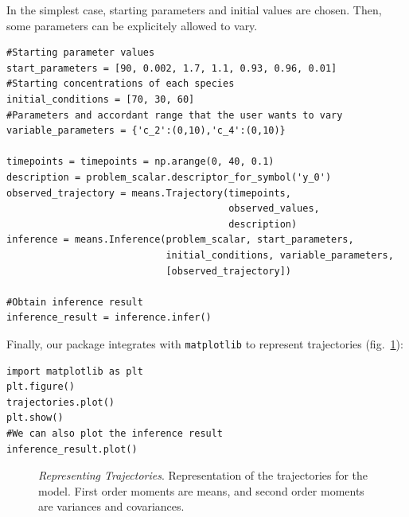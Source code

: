 In the simplest case, starting parameters and initial values are chosen.
Then, some parameters can be explicitely allowed to vary. 

\begin{framed}
\begin{verbatim}
#Starting parameter values
start_parameters = [90, 0.002, 1.7, 1.1, 0.93, 0.96, 0.01]
#Starting concentrations of each species
initial_conditions = [70, 30, 60]
#Parameters and accordant range that the user wants to vary
variable_parameters = {'c_2':(0,10),'c_4':(0,10)}
        
timepoints = timepoints = np.arange(0, 40, 0.1)
description = problem_scalar.descriptor_for_symbol('y_0')
observed_trajectory = means.Trajectory(timepoints,
                                       observed_values,
                                       description)
inference = means.Inference(problem_scalar, start_parameters, 
                            initial_conditions, variable_parameters, 
                            [observed_trajectory])

#Obtain inference result
inference_result = inference.infer()
\end{verbatim}
\end{framed}

Finally, our package integrates with \texttt{matplotlib} to represent trajectories (fig.~\ref{fig:trajectories_exple}):

\begin{framed}
\begin{verbatim}
import matplotlib as plt
plt.figure()
trajectories.plot()
plt.show()
#We can also plot the inference result
inference_result.plot()
\end{verbatim}
\end{framed}

\begin{figure}
\caption{\emph{Representing Trajectories}.
Representation of the trajectories for the \pft{} model.
First order moments are means, and second order moments are variances and covariances.
}
\label{fig:trajectories_exple}
\end{figure}



